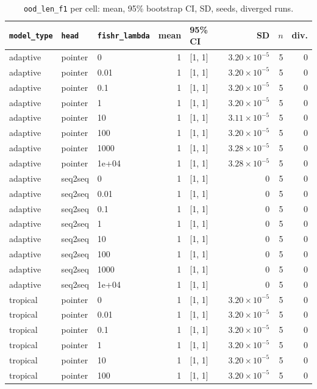 \documentclass[10pt]{article}
\begin{document}
{\small
\begin{longtable}{lllrlrrr}
\caption{\texttt{ood\_len\_f1} per cell: mean, 95\% bootstrap CI, SD, seeds, diverged runs.}\label{tab:summary-ood_len_f1}\\
\toprule
\texttt{model\_type} & \texttt{head} & \texttt{fishr\_lambda} & mean & 95\% CI & SD & $n$ & div.\\
\midrule
\endhead
adaptive & pointer & 0 & 1 & [1, 1] & $3.20\times10^{-5}$ & 5 & 0\\
adaptive & pointer & 0.01 & 1 & [1, 1] & $3.20\times10^{-5}$ & 5 & 0\\
adaptive & pointer & 0.1 & 1 & [1, 1] & $3.20\times10^{-5}$ & 5 & 0\\
adaptive & pointer & 1 & 1 & [1, 1] & $3.20\times10^{-5}$ & 5 & 0\\
adaptive & pointer & 10 & 1 & [1, 1] & $3.11\times10^{-5}$ & 5 & 0\\
adaptive & pointer & 100 & 1 & [1, 1] & $3.20\times10^{-5}$ & 5 & 0\\
adaptive & pointer & 1000 & 1 & [1, 1] & $3.28\times10^{-5}$ & 5 & 0\\
adaptive & pointer & 1e+04 & 1 & [1, 1] & $3.28\times10^{-5}$ & 5 & 0\\
adaptive & seq2seq & 0 & 1 & [1, 1] & 0 & 5 & 0\\
adaptive & seq2seq & 0.01 & 1 & [1, 1] & 0 & 5 & 0\\
adaptive & seq2seq & 0.1 & 1 & [1, 1] & 0 & 5 & 0\\
adaptive & seq2seq & 1 & 1 & [1, 1] & 0 & 5 & 0\\
adaptive & seq2seq & 10 & 1 & [1, 1] & 0 & 5 & 0\\
adaptive & seq2seq & 100 & 1 & [1, 1] & 0 & 5 & 0\\
adaptive & seq2seq & 1000 & 1 & [1, 1] & 0 & 5 & 0\\
adaptive & seq2seq & 1e+04 & 1 & [1, 1] & 0 & 5 & 0\\
tropical & pointer & 0 & 1 & [1, 1] & $3.20\times10^{-5}$ & 5 & 0\\
tropical & pointer & 0.01 & 1 & [1, 1] & $3.20\times10^{-5}$ & 5 & 0\\
tropical & pointer & 0.1 & 1 & [1, 1] & $3.20\times10^{-5}$ & 5 & 0\\
tropical & pointer & 1 & 1 & [1, 1] & $3.20\times10^{-5}$ & 5 & 0\\
tropical & pointer & 10 & 1 & [1, 1] & $3.20\times10^{-5}$ & 5 & 0\\
tropical & pointer & 100 & 1 & [1, 1] & $3.20\times10^{-5}$ & 5 & 0\\

\end{longtable}}
\end{document}
